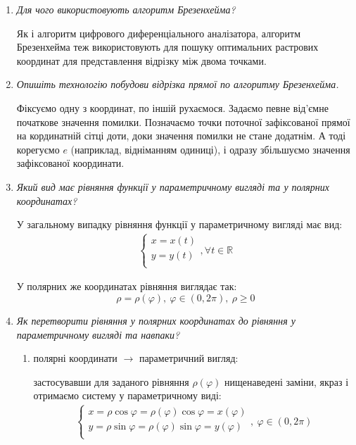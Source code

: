 \documentclass[a4paper,14pt]{extarticle} %
\begin{document}
\begin{enumerate}

    \item \textit{Для чого використовують алгоритм Брезенхейма?}

    Як і алгоритм цифрового диференціального аналізатора, алгоритм Брезенхейма теж використовують для пошуку 
    оптимальних растрових координат для представлення відрізку між двома точками.

    \item \textit{Опишіть технологію побудови відрізка прямої по алгоритму Брезенхейма.}

    Фіксуємо одну з координат, по іншій рухаємося. Задаємо певне від'ємне початкове значення помилки. Позначаємо 
    точки поточної зафіксованої прямої на кординатній сітці доти, доки значення помилки не стане додатнім. А тоді 
    корегуємо $e$ (наприклад, відніманням одиниці), і одразу збільшуємо значення зафіксованої координати.

    \item \textit{Який вид має рівняння функції у параметричному вигляді та у полярних координатах?}

    У загальному випадку рівняння функції у параметричному вигляді має вид:
    \begin{align*}   
        \begin{cases}
            x=x(t) \\ 
            y=y(t) \\
        \end{cases}, \forall t \in \mathbb{R}
    \end{align*}

    У полярних же координатах рівняння виглядає так:
    \[ \rho=\rho(\varphi),\ \varphi \in (0,2\pi),\ \rho \geqslant 0 \] 

    \item \textit{Як перетворити рівняння у полярних координатах до рівняння у параметричному вигляді та навпаки?}
    
    \begin{enumerate}
        \item полярні координати $\rightarrow$ параметричний вигляд: \par
        застосувавши для заданого рівняння $\rho(\varphi)$ нищенаведені заміни, якраз і отримаємо 
        систему у параметричному виді: 
        \begin{align*}        
            \begin{cases}
                x=\rho\cos\varphi=\rho(\varphi)\cos\varphi=x(\varphi) \\ 
                y=\rho\sin\varphi=\rho(\varphi)\sin\varphi=y(\varphi) \\
            \end{cases},\ \varphi \in (0,2\pi)
        \end{align*} 


\end{enumerate}
\end{enumerate}
\end{document}
